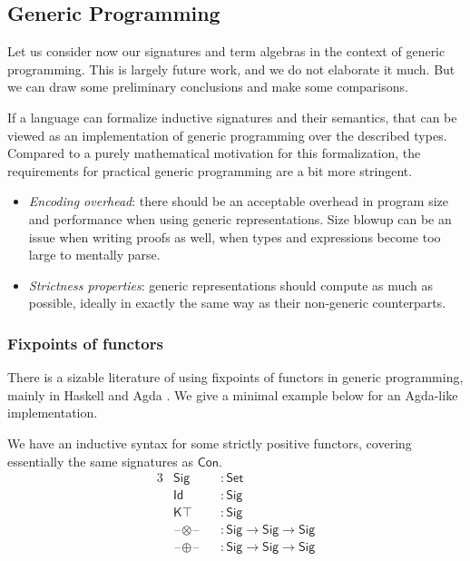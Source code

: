 \documentclass[12pt,a4paper,twoside,openany]{book}
\theoremstyle{remark}
\theoremstyle{definition}
\theoremstyle{theorem}
\newcommand{\ms}[1]{\mathsf{#1}}
\newcommand{\Con}{\mathsf{Con}}
\newcommand{\blank}{\mathord{\hspace{1pt}\text{--}\hspace{1pt}}}
\newcommand{\Set}{\mathsf{Set}}
\begin{document}
\subsection{Generic Programming}
\label{sec:generic-programming}

Let us consider now our signatures and term algebras in the context of generic
programming. This is largely future work, and we do not elaborate it much. But we
can draw some preliminary conclusions and make some comparisons.

If a language can formalize inductive signatures and their semantics, that can
be viewed as an implementation of generic programming over the described types.
Compared to a purely mathematical motivation for this formalization, the
requirements for practical generic programming are a bit more stringent.
\begin{itemize}
  \item \emph{Encoding overhead}: there should be an acceptable overhead in
    program size and performance when using generic representations.  Size
    blowup can be an issue when writing proofs as well, when types and
    expressions become too large to mentally parse.
  \item \emph{Strictness properties}: generic representations should compute as
    much as possible, ideally in exactly the same way as their non-generic
    counterparts.
\end{itemize}

\subsubsection{Fixpoints of functors}
There is a sizable literature of using fixpoints of functors in generic
programming, mainly in Haskell \cite{alacarte,compdata,multirec} and Agda
\cite{loh11generic,allais20type}. We give a minimal example below for an
Agda-like implementation.

We have an inductive syntax for some strictly positive functors, covering essentially the
same signatures as $\Con$.
\begin{alignat*}{3}
  & \ms{Sig}                &&: \Set \\
  & \ms{Id}                 &&: \ms{Sig} \\
  & \ms{K\top}              &&: \ms{Sig} \\
  & \blank\!\otimes\!\blank &&: \ms{Sig} \to \ms{Sig} \to \ms{Sig} \\
  & \blank\!\oplus\!\blank  &&: \ms{Sig} \to \ms{Sig} \to \ms{Sig}
\end{alignat*}
\end{document}
